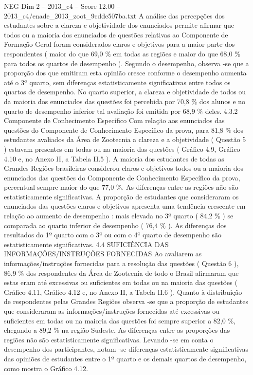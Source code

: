 \begin{textsample}{NEG Dim 2 – 2013\_c4 – Score 12.00 – 2013\_c4/enade\_2013\_zoot\_9cdde507ba.txt}
A análise das percepções dos estudantes sobre a clareza e objetividade dos enunciados permite afirmar que todos ou a maioria dos enunciados de questões relativas ao Componente de Formação Geral foram considerados claros e objetivos para a maior parte dos respondentes ( maior do que 69,0 \% em todas as regiões e maior do que 68,0 \% para todos os quartos de desempenho ).
Segundo o desempenho, observa -se que a proporção dos que emitiram esta opinião cresce conforme o desempenho aumenta até o 3º quarto, sem diferenças estatisticamente significativas entre todos os quartos de desempenho.
No quarto superior, a clareza e objetividade de todos ou da maioria dos enunciados das questões foi percebida por 70,8 \% dos alunos e no quarto de desempenho inferior tal avaliação foi emitida por 68,9 \% deles. 4.3.2 Componente de Conhecimento Específico Com relação aos enunciados das questões do Componente de Conhecimento Específico da prova, para 81,8 \% dos estudantes avaliados da Área de Zootecnia a clareza e a objetividade ( Questão 5 ) estavam presentes em todas ou na maioria das questões ( Gráfico 4.9, Gráfico 4.10 e, no Anexo II, a Tabela II.5 ).
A maioria dos estudantes de todas as Grandes Regiões brasileiras considerou claros e objetivos todos ou a maioria dos enunciados das questões do Componente de Conhecimento Específico da prova, percentual sempre maior do que 77,0 \%.
As diferenças entre as regiões não são estatisticamente significativas.
A proporção de estudantes que consideraram os enunciados das questões claros e objetivos apresenta uma tendência crescente em relação ao aumento de desempenho : mais elevada no 3º quarto ( 84,2 \% ) se comparada ao quarto inferior de desempenho ( 76,4 \% ).
As diferenças dos resultados do 1º quarto com o 3º ou com o 4º quarto de desempenho são estatisticamente significativas. 4.4 SUFICIÊNCIA DAS INFORMAÇÕES/INSTRUÇÕES FORNECIDAS Ao avaliarem as informações/instruções fornecidas para a resolução das questões ( Questão 6 ), 86,9 \% dos respondentes da Área de Zootecnia de todo o Brasil afirmaram que estas eram até excessivas ou suficientes em todas ou na maioria das questões ( Gráfico 4.11, Gráfico 4.12 e, no Anexo II, a Tabela II.6 ).
Quanto à distribuição de respondentes pelas Grandes Regiões observa -se que a proporção de estudantes que consideraram as informações/instruções fornecidas até excessivas ou suficientes em todas ou na maioria das questões foi sempre superior a 82,0 \%, chegando a 89,2 \% na região Sudeste.
As diferenças entre as proporções das regiões não são estatisticamente significativas.
Levando -se em conta o desempenho dos participantes, notam -se diferenças estatisticamente significativas das opiniões de estudantes entre o 1º quarto e os demais quartos de desempenho, como mostra o Gráfico 4.12.

\end{textsample}

